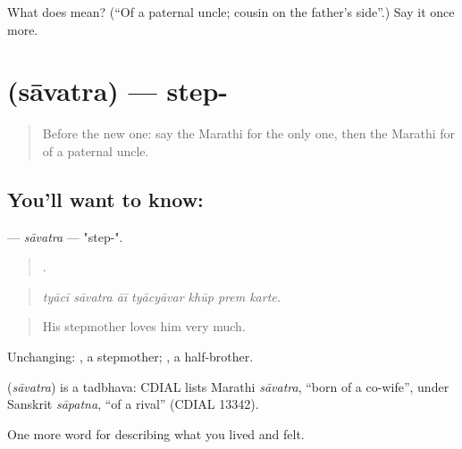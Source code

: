 \begin{tcolorbox}[breakable,colback=teal!4,colframe=teal!35!black,title={Before you move on}]
What does  mean? (\textquotedblleft{}Of a paternal uncle; cousin on the father's side\textquotedblright{}.) Say it once more.
\end{tcolorbox}
\section[\texorpdfstring{\mr{सावत्र} (sāvatra)}{सावत्र (sāvatra)}]{ (sāvatra) — step-}

\label{lesson:MR-C497-savatra}



\begin{quote}
Before the new one: say the Marathi for the only one, then the Marathi for of a paternal uncle.
\end{quote}

\subsection*{You'll want to know: }
\textbf{} — \emph{sāvatra} — "step-".

\begin{quote}
      .
\end{quote}

\begin{quote}
\emph{tyācī sāvatra āī tyācyāvar khūp prem karte.}
\end{quote}

\begin{quote}
His stepmother loves him very much.
\end{quote}

Unchanging:  , a stepmother;  , a half-brother.

\begin{cousinweb}
\textbf{} (\emph{sāvatra}) is a tadbhava: CDIAL lists Marathi \emph{sāvatra}, \textquotedblleft{}born of a co-wife\textquotedblright{}, under Sanskrit \emph{sāpatna}, \textquotedblleft{}of a rival\textquotedblright{} (CDIAL 13342).
\end{cousinweb}

\begin{grammarlens}[title={What you've built}]
One more word for describing what you lived and felt.
\end{grammarlens}

